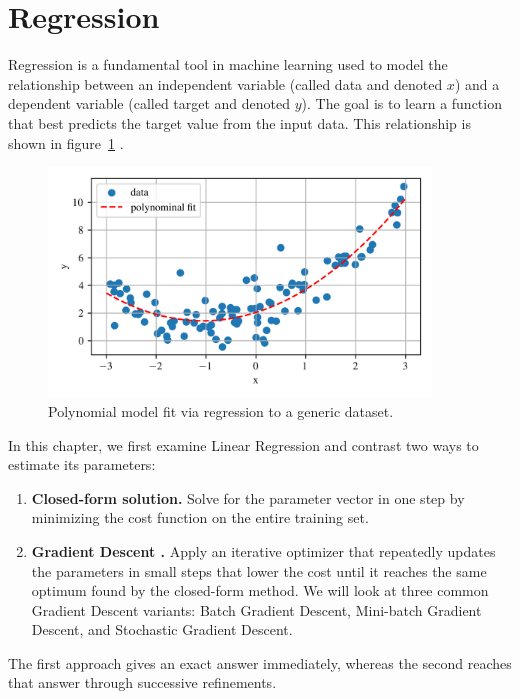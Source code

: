 \documentclass[12pt,letter]{article}
\begin{document}
	
	\setcounter{section}{1}	
	\setcounter{figure}{0}   
	\renewcommand\thefigure{\thesection.\arabic{figure}}
	\setcounter{equation}{0}   
	\renewcommand\theequation{\thesection.\arabic{equation}}
	\section{Regression}


Regression is a fundamental tool in machine learning used to model the relationship between an independent variable (called data and denoted $x$) and a dependent variable (called target and denoted $y$). The goal is to learn a function that best predicts the target value from the input data. This relationship is shown in figure~\ref{fig:general_regression} .

\begin{figure}[H]
	\centering
	\includegraphics[width=4in]{../figures/polynomial_regression_3}
	\caption{Polynomial model fit via regression to a generic dataset. }
	\label{fig:general_regression}
\end{figure}

In this chapter, we first examine Linear Regression and contrast two ways to estimate its parameters:
\begin{enumerate}
\item \textbf{Closed-form solution.} Solve for the parameter vector in one step by minimizing the cost function on the entire training set.  
\item \textbf{Gradient Descent .} Apply an iterative optimizer that repeatedly updates the parameters in small steps that lower the cost until it reaches the same optimum found by the closed-form method. We will look at three common Gradient Descent variants: Batch Gradient Descent, Mini-batch Gradient Descent, and Stochastic Gradient Descent.
\end{enumerate}
The first approach gives an exact answer immediately, whereas the second reaches that answer through successive refinements.
\end{document}
